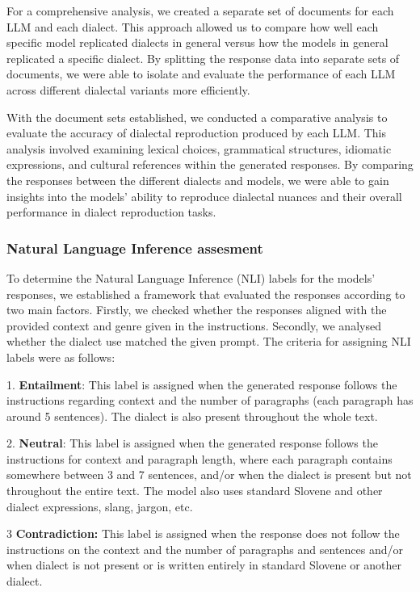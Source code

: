 \documentclass[fleqn,moreauthors,10pt]{ds_report}
\begin{document}
    For a comprehensive analysis, we created a separate set of documents for each LLM and each dialect. This approach allowed us to compare how well each specific model replicated dialects in general versus how the models in general replicated a specific dialect. By splitting the response data into separate sets of documents, we were able to isolate and evaluate the performance of each LLM across different dialectal variants more efficiently.

    With the document sets established, we conducted a comparative analysis to evaluate the accuracy of dialectal reproduction produced by each LLM. This analysis involved examining lexical choices, grammatical structures, idiomatic expressions, and cultural references within the generated responses. By comparing the responses between the different dialects and models, we were able to gain insights into the models' ability to reproduce dialectal nuances and their overall performance in dialect reproduction tasks.

\subsubsection{Natural Language Inference assesment }

    To determine the Natural Language Inference (NLI) labels for the models' responses, we established a framework that evaluated the responses according to two main factors. Firstly, we checked whether the responses aligned with the provided context and genre given in the instructions. Secondly, we analysed whether the dialect use matched the given prompt. The criteria for assigning NLI labels were as follows:

1. \textbf{Entailment}: This label is assigned when the generated response follows the instructions regarding context and the number of paragraphs (each paragraph has around 5 sentences). The dialect is also present throughout the whole text.

2. \textbf{Neutral}: This label is assigned when the generated response follows the instructions for context and paragraph length, where each paragraph contains somewhere between 3 and 7 sentences, and/or when the dialect is present but not throughout the entire text. The model also uses standard Slovene and other dialect expressions, slang, jargon, etc.

3 \textbf{Contradiction:} This label is assigned when the response does not follow the instructions on the context and the number of paragraphs and sentences and/or when dialect is not present or is written entirely in standard Slovene or another dialect.
\end{document}
